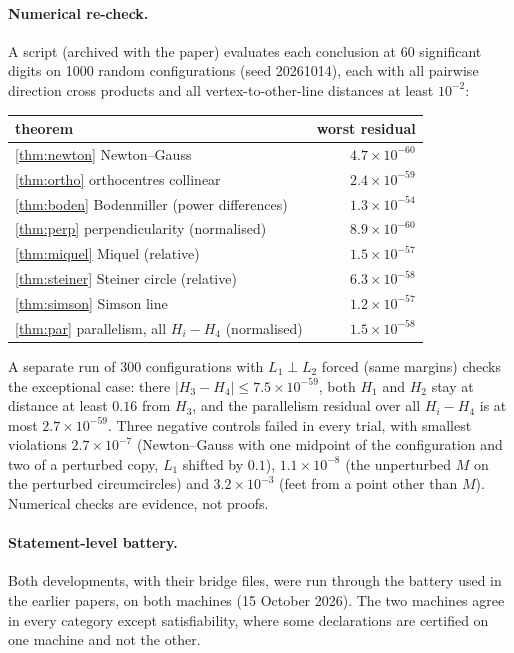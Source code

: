 \documentclass[11pt]{article}
\theoremstyle{definition}
\theoremstyle{remark}
\begin{document}
\paragraph{Numerical re-check.} A script (archived with the paper) evaluates each conclusion at 60
significant digits on 1000 random configurations (seed 20261014), each with all pairwise direction
cross products and all vertex-to-other-line distances at least $10^{-2}$:
\begin{center}\small
\begin{tabular}{lr}
\toprule
theorem & worst residual\\
\midrule
\ref{thm:newton} Newton--Gauss & $4.7\times10^{-60}$\\
\ref{thm:ortho} orthocentres collinear & $2.4\times10^{-59}$\\
\ref{thm:boden} Bodenmiller (power differences) & $1.3\times10^{-54}$\\
\ref{thm:perp} perpendicularity (normalised) & $8.9\times10^{-60}$\\
\ref{thm:miquel} Miquel (relative) & $1.5\times10^{-57}$\\
\ref{thm:steiner} Steiner circle (relative) & $6.3\times10^{-58}$\\
\ref{thm:simson} Simson line & $1.2\times10^{-57}$\\
\ref{thm:par} parallelism, all $H_i-H_4$ (normalised) & $1.5\times10^{-58}$\\
\bottomrule
\end{tabular}
\end{center}
A separate run of 300 configurations with $L_1\perp L_2$ forced (same margins) checks the
exceptional case: there $|H_3-H_4|\le7.5\times10^{-59}$, both $H_1$ and $H_2$ stay at distance at least
$0.16$ from $H_3$, and the parallelism residual over all $H_i-H_4$ is at most $2.7\times10^{-59}$. Three
negative controls failed in every trial, with smallest violations $2.7\times10^{-7}$ (Newton--Gauss
with one midpoint of the configuration and two of a perturbed copy, $L_1$ shifted by $0.1$), $1.1\times10^{-8}$ (the unperturbed $M$ on the
perturbed circumcircles) and $3.2\times10^{-3}$ (feet from a point other than $M$). Numerical checks are
evidence, not proofs.

\paragraph{Statement-level battery.} Both developments, with their bridge files, were run through the
battery used in the earlier papers, on both machines (15 October 2026). The two machines agree in every
category except satisfiability, where some declarations are certified on one machine and not the other.
\end{document}
